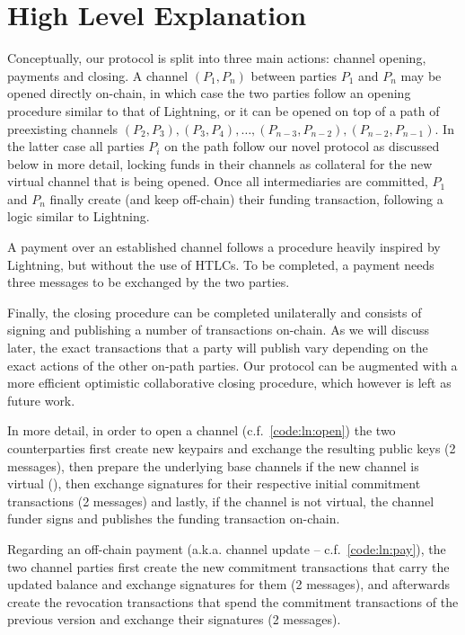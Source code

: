 \section{High Level Explanation}
  Conceptually, our protocol is split into three main actions: channel opening,
  payments and closing. A channel $(P_1, P_n)$ between parties $P_1$ and $P_n$
  may be opened directly on-chain, in which case the two parties follow an
  opening procedure similar to that of Lightning, or it can be opened
  on top of a path of preexisting channels $(P_2, P_3), (P_3, P_4), \dots,
  (P_{n-3}, P_{n-2}), (P_{n-2}, P_{n-1})$. In the latter case all parties $P_i$
  on the path follow our novel protocol as discussed below in more detail,
  locking funds in their channels as collateral for the new virtual channel that
  is being opened. Once all intermediaries are committed, $P_1$ and $P_n$
  finally create (and keep off-chain) their funding transaction, following a
  logic similar to Lightning.

  A payment over an established channel follows a procedure heavily inspired by
  Lightning, but without the use of HTLCs. To be completed, a payment needs
  three messages to be exchanged by the two parties.

  Finally, the closing procedure can be completed unilaterally and consists of
  signing and publishing a number of transactions on-chain. As we will discuss
  later, the exact transactions that a party will publish vary depending on the
  exact actions of the other on-path parties. Our protocol can be augmented with
  a more efficient optimistic collaborative closing procedure, which however is
  left as future work.

  In more detail, in order to open a channel (c.f.~\ref{code:ln:open}) the two
  counterparties first create new keypairs and exchange the resulting public
  keys (2 messages), then prepare the underlying base channels if the new
  channel is virtual (), then exchange signatures for their
  respective initial commitment transactions (2 messages) and lastly, if the
  channel is not virtual, the channel funder  signs and publishes the funding
  transaction on-chain.

  Regarding an off-chain payment (a.k.a. channel update --
  c.f.~\ref{code:ln:pay}), the two channel parties first create the new
  commitment transactions that carry the updated balance and exchange signatures
  for them (2 messages), and afterwards create the revocation transactions that
  spend the commitment transactions of the previous version and exchange their
  signatures (2 messages).

